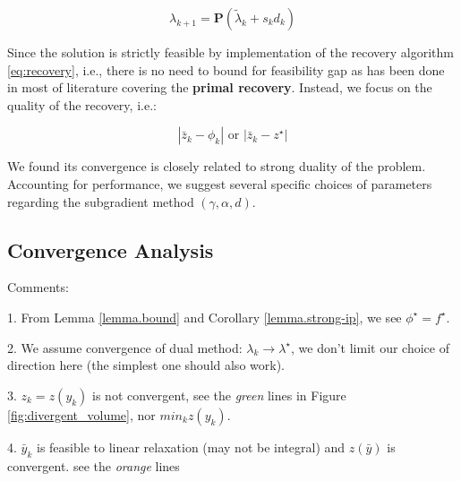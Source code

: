 \documentclass[../main]{subfiles}
\begin{document}
\[\lambda_{k+1} = \mathbf{P}(\tilde\lambda_{k} + s_{k}d_{k})\]

Since the solution is strictly feasible by implementation of the
recovery algorithm \eqref{eq:recovery}, i.e., there is no need to bound for feasibility gap
as has been done in most of literature covering the \textbf{primal
  recovery}. Instead, we focus on the quality of the recovery, i.e.:

\[
  |\bar z_k - \phi_k| \textrm { or } |\bar z_k - z^\star|
\]

We found its convergence is closely related to strong duality of the problem. Accounting for performance,
we suggest several specific choices of parameters regarding the subgradient method \((\gamma, \alpha, d)\).


\subsection{Convergence Analysis}\label{dual.analysis}

Comments:

1. From Lemma \ref{lemma.bound} and Corollary \ref{lemma.strong-ip}, we see \(\phi^\star = f^\star\).

2. We assume convergence of dual method: \(\lambda_k \to \lambda^\star\), we don't limit our choice of direction here (the simplest one should also work).

3. \(z_k = z(y_k)\) is not convergent, see the \emph{green} lines in Figure \ref{fig:divergent_volume}, nor \(min_k z(y_k)\).

4. \(\bar y_k\) is feasible to linear relaxation (may not be integral) and
\(z(\bar y)\) is convergent. see the \emph{orange} lines



\end{document}
